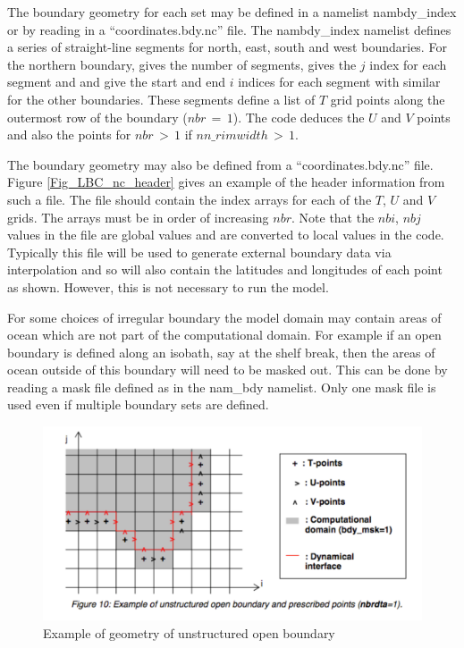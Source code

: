 The boundary geometry for each set may be defined in a namelist
nambdy\_index or by reading in a ``coordinates.bdy.nc'' file.
The
nambdy\_index namelist defines a series of straight-line
segments for
north, east, south and west boundaries. For the northern
boundary,
 gives the number of segments,  gives
the $j$
index for each segment and  and  give the
start
and end $i$ indices for each segment with similar for the other
boundaries. These segments define a list of $T$ grid points
along the
outermost row of the boundary ($nbr\,=\, 1$). The code deduces
the $U$ and
$V$ points and also the points for $nbr\,>\, 1$ if
$nn\_rimwidth\,>\,1$.

The boundary geometry may also be defined from a
``coordinates.bdy.nc'' file. Figure \ref{Fig_LBC_nc_header}
gives an example of the header information from such a file. The
file
should contain the index arrays for each of the $T$, $U$ and $V$grids. The
arrays must be in order of increasing $nbr$. Note
that the
$nbi$, $nbj$ values in the file are global values and are
converted to
local values in the code. Typically this file will be used to
generate
external boundary data via interpolation and so will also
contain the
latitudes and longitudes of each point as shown. However, this
is not
necessary to run the model. 

For some choices of irregular boundary the model domain may
contain
areas of ocean which are not part of the computational domain.
For
example if an open boundary is defined along an isobath, say at
the
shelf break, then the areas of ocean outside of this boundary
will
need to be masked out. This can be done by reading a mask file
defined
as  in the nam\_bdy namelist. Only one mask
file is
used even if multiple boundary sets are defined.

\begin{figure}[!t]      \begin{center}
\includegraphics[width=1.0\textwidth]{./TexFiles/Figures/Fig_LBC_bdy_geom.pdf}
\caption {      \label{Fig_LBC_bdy_geom}
Example of geometry of unstructured open boundary}
\end{center}   \end{figure}


